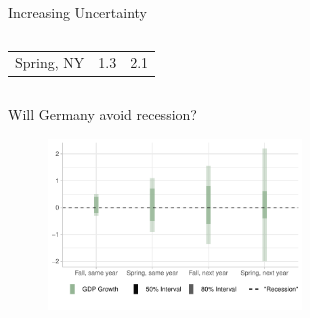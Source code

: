 \documentclass[en]{sdqbeamer}
\begin{document}
\begin{frame}{Increasing Uncertainty}
\begin{columns}
\begin{column}{0.4\textwidth}
\begin{table}
\begin{tabular}{ l c c }
Spring, NY &1.3 &2.1 \\ 
\end{tabular}
\end{table}
\vspace{1.25cm}
\end{column}
\end{columns}


\end{frame}
\addtocounter{framenumber}{-1}
\begin{frame}{Will Germany avoid recession?}
\begin{figure}
        \centering
        \includegraphics[width=0.6\textwidth]{figures/horizon_uncc_germany2023.pdf}
        \label{fig:enter-label}
    \end{figure}


\end{frame}
\end{document}
